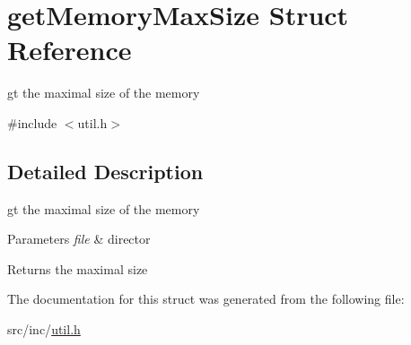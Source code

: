 \hypertarget{structget_memory_max_size}{}\section{get\+Memory\+Max\+Size Struct Reference}
\label{structget_memory_max_size}


gt the maximal size of the memory  




{\ttfamily \#include $<$util.\+h$>$}



\subsection{Detailed Description}
gt the maximal size of the memory 


\begin{DoxyParams}{Parameters}
{\em file} & director \\
\hline
\end{DoxyParams}
\begin{DoxyReturn}{Returns}
the maximal size 
\end{DoxyReturn}


The documentation for this struct was generated from the following file\+:\begin{DoxyCompactItemize}
\item 
src/inc/\mbox{\hyperlink{util_8h}{util.\+h}}\end{DoxyCompactItemize}
